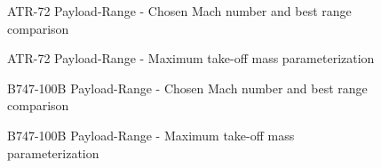 %
\begin{table}[H]
\caption{Method results comparison with known data}
\end{table}
%
\begin{figure}[!t]
\centering

\caption{ATR-72 Payload-Range - Chosen Mach number and best range comparison}
\end{figure}
%
\begin{figure}[!b]
\centering

\caption{ATR-72 Payload-Range - Maximum take-off mass parameterization}
\end{figure}
%
\begin{figure}[!t]
\centering

\caption{B747-100B Payload-Range - Chosen Mach number and best range comparison}
\end{figure}
%
\begin{figure}[!b]
\centering

\caption{B747-100B Payload-Range - Maximum take-off mass parameterization}
\end{figure}